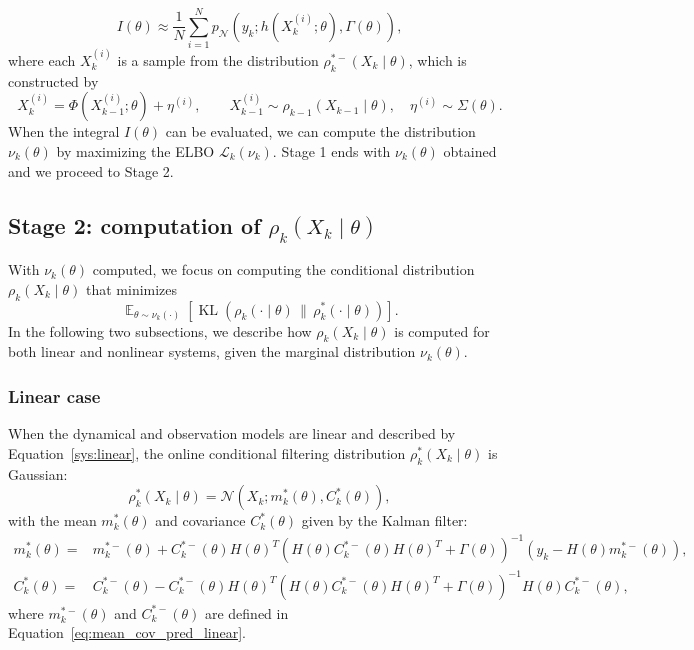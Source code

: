 \documentclass[preprint,3p,times]{elsarticle}
\DeclareMathOperator{\E}{\mathbb{E}}
\DeclareMathOperator{\KL}{KL}
\newcommand{\pdense}{p}
\begin{document}
\begin{equation}
I(\theta) \approx \frac{1}{N}\sum_{i=1}^N\pdense_{\mathcal{N}}\left(y_k;h(X_k^{(i)};\theta),\Gamma(\theta)\right),
\end{equation}
where each $X_k^{(i)}$ is a sample from the distribution $\rho_k^{*-}(X_k \mid \theta)$, which is constructed by
\begin{equation*}
X_k^{(i)} = \Phi(X_{k-1}^{(i)};\theta) + \eta^{(i)}, \qquad X_{k-1}^{(i)} \sim \rho_{k-1}(X_{k-1} \mid \theta), \quad \eta^{(i)} \sim \Sigma(\theta).
\end{equation*}
When the integral $I(\theta)$ can be evaluated, we can compute the distribution $\nu_k(\theta)$ by maximizing the ELBO $\mathcal{L}_k(\nu_k)$. Stage 1 ends with $\nu_k(\theta)$ obtained and we proceed to Stage 2.

\subsection{Stage 2: computation of \( \rho_k(X_k \mid \theta) \)}
\label{sec:step2}
With $\nu_k(\theta)$ computed, we focus on computing the conditional distribution \( \rho_k(X_k \mid \theta) \) that minimizes
\[
\E_{\theta \sim \nu_k(\cdot)}\left[ \KL\!\left(\rho_k(\cdot\mid \theta) \,\|\, \rho_k^*(\cdot \mid \theta) \right) \right].
\]
In the following two subsections, we describe how \( \rho_k(X_k \mid \theta) \) is computed for both linear and nonlinear systems, given the marginal distribution $\nu_k(\theta)$.

\subsubsection{Linear case}
When the dynamical and observation models are linear and described by Equation~\eqref{sys:linear}, the online conditional filtering distribution \( \rho_k^*(X_k \mid \theta) \) is Gaussian:
\[
\rho_k^*(X_k \mid \theta) = \mathcal{N}\left(X_k; m_k^*(\theta), C_k^*(\theta)\right),
\]
with the mean \( m_k^*(\theta) \) and covariance \( C_k^*(\theta) \) given by the Kalman filter:
\begin{align}
m_k^*(\theta) =& m_k^{*-}(\theta)+C_k^{*-}(\theta)H(\theta)^T\left(H(\theta)C_k^{*-}(\theta)H(\theta)^T+\Gamma(\theta)\right)^{-1}\left(y_k-H(\theta)m_k^{*-}(\theta)\right), 
\label{eq:kf_mean_post} \\
C_k^*(\theta) =& C_k^{*-}(\theta) - C_k^{*-}(\theta)H(\theta)^T\left(H(\theta)C_k^{*-}(\theta)H(\theta)^T+\Gamma(\theta)\right)^{-1}H(\theta)C_k^{*-}(\theta),
\label{eq:kf_var_post}
\end{align}
where $m_k^{*-}(\theta)$ and $C_k^{*-}(\theta)$ are defined in Equation~\eqref{eq:mean_cov_pred_linear}.
\end{document}
